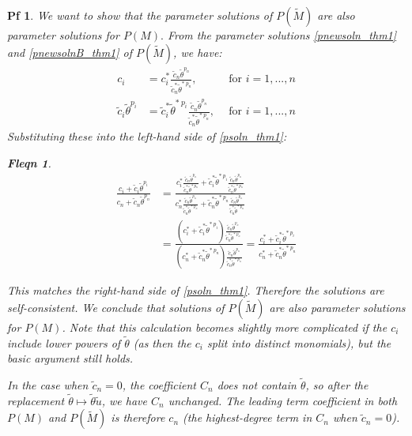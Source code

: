 \documentclass[10pt,a4paper]{amsart}
\newtheorem{pf}{Pf}
\newtheorem{fleqn}{Fleqn}
\begin{document}
\begin{pf}
    We want to show that the parameter solutions of $P(\tilde{M})$ are also parameter solutions for $P(M).$
    From the parameter solutions \cref{pnewsoln_thm1} and \cref{pnewsolnB_thm1} of $P(\tilde{M})$, we have:
    \begin{align*}
        c_i & = c^*_i \frac{\tilde{c}_n \tilde{\theta}^{p_n}}{\tilde{c}_n^* \tilde{\theta}^{*~p_n}}, & ~~\text{for~}i=1,...,n \\
        \tilde{c}_i \tilde{\theta}^{p_i} & = \tilde{c}_i^* \tilde{\theta}^{*~p_i} \frac{\tilde{c}_n \tilde{\theta}^{p_n}}{\tilde{c}_n^* \tilde{\theta}^{*~p_n}}, & ~~\text{for~}i=1,...,n
    \end{align*}
    Substituting these into the left-hand side of \cref{psoln_thm1}:
    \begin{fleqn}
    \begin{align*}
        \frac{c_i + \tilde{c}_i \tilde{\theta}^{p_i}}{c_n + \tilde{c}_n \tilde{\theta}^{p_n}} &= \frac{c^*_i \frac{\tilde{c}_n \tilde{\theta}^{p_n}}{\tilde{c}_n^* \tilde{\theta}^{*~p_n}} + \tilde{c}_i^* \tilde{\theta}^{*~p_i} \frac{\tilde{c}_n \tilde{\theta}^{p_n}}{\tilde{c}_n^* \tilde{\theta}^{*~p_n}}}{c_n^* \frac{\tilde{c}_n \tilde{\theta}^{p_n}}{\tilde{c}_n^* \tilde{\theta}^{*~p_n}} + \tilde{c}_n^* \tilde{\theta}^{*~p_n} \frac{\tilde{c}_n \tilde{\theta}^{p_n}}{\tilde{c}_n^* \tilde{\theta}^{*~p_n}}} \\
        &= \frac{(c^*_i + \tilde{c}_i^* \tilde{\theta}^{*~p_i}) \frac{\tilde{c}_n \tilde{\theta}^{p_n}}{\tilde{c}_n^* \tilde{\theta}^{*~p_n}}}{(c_n^* + \tilde{c}_n^* \tilde{\theta}^{*~p_n}) \frac{\tilde{c}_n \tilde{\theta}^{p_n}}{\tilde{c}_n^* \tilde{\theta}^{*~p_n}}} = \frac{c^*_i + \tilde{c}_i^* \tilde{\theta}^{*~p_i}}{c_n^* + \tilde{c}_n^* \tilde{\theta}^{*~p_n}}
    \end{align*}
    \end{fleqn}
    This matches the right-hand side of \cref{psoln_thm1}. Therefore the solutions are self-consistent.
    We conclude that solutions of $P(\tilde{M})$ are also parameter solutions for $P(M)$. Note that this calculation becomes slightly more complicated if the $c_i$ include lower powers of $\tilde{\theta}$ (as then the $c_i$ split into distinct monomials), but the basic argument still holds. 
    
    In the case when $\tilde{c}_n = 0$, the coefficient $C_n$ does not contain $\tilde{\theta}$, so after the replacement $\tilde{\theta} \mapsto \tilde{\theta}\tilde{u}$, we have $C_n$ unchanged. The leading term coefficient in both $P(M)$ and $P(\tilde{M})$ is therefore $c_n$ (the highest-degree term in $C_n$ when $\tilde{c}_n = 0$).


\end{pf}
\end{document}
